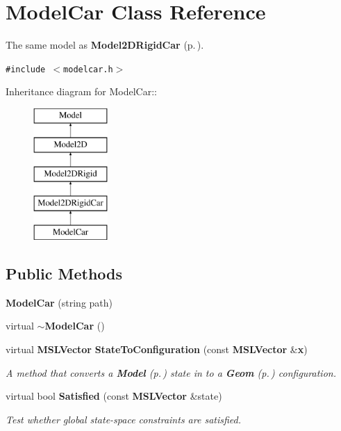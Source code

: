 \section{Model\-Car  Class Reference}
\label{classModelCar}
The same model as {\bf Model2DRigid\-Car} {\rm (p.\,\pageref{classModel2DRigidCar})}. 


{\tt \#include $<$modelcar.h$>$}

Inheritance diagram for Model\-Car::\begin{figure}[H]
\begin{center}
\leavevmode
\includegraphics[height=5cm]{classModelCar}
\end{center}
\end{figure}
\subsection*{Public Methods}
\begin{CompactItemize}
\item 
{\bf Model\-Car} (string path)
\item 
virtual {\bf $\sim$Model\-Car} ()
\item 
virtual {\bf MSLVector} {\bf State\-To\-Configuration} (const {\bf MSLVector} \&{\bf x})
\begin{CompactList}\small\item\em A method that converts a {\bf Model} {\rm (p.\,\pageref{classModel})} state in to a {\bf Geom} {\rm (p.\,\pageref{classGeom})} configuration.\item\end{CompactList}\item 
virtual bool {\bf Satisfied} (const {\bf MSLVector} \&state)
\begin{CompactList}\small\item\em Test whether global state-space constraints are satisfied.\item\end{CompactList}\end{CompactItemize}
